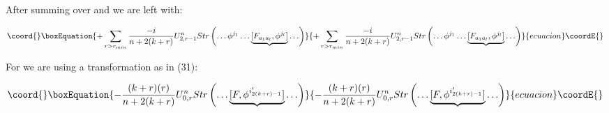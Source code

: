 \documentclass[a4paper,12pt]{article}
\begin{document}
After summing over \coordHE{} and \coordHE{} we are left with:
\begin{center}
\coordHE{}
\begin{equation}\coord{}\boxEquation{
+\sum_{r>r_{min}}\frac{-i}{n+2(k+r)}U^n_{2,r-1}Str\left(\ldots \phi^{j_1}\ldots \underbrace{[F_{a_1a_l},\phi^{j_l}]}\ldots \right) 
}{
+\sum_{r>r_{min}}\frac{-i}{n+2(k+r)}U^n_{2,r-1}Str\left(\ldots \phi^{j_1}\ldots \underbrace{[F_{a_1a_l},\phi^{j_l}]}\ldots \right) 
}{ecuacion}\coordE{}\end{equation}
\end{center}
For \coordHE{} we are using a transformation as in (31):
\begin{center}
\coordHE{}
\begin{equation}\coord{}\boxEquation{
-\frac{(k+r)(r)}{n+2(k+r)}U^n_{0,r}Str\left(\ldots \underbrace{[F,\phi^{i_{2(k+r)-1}'}]}\ldots \right)
}{
-\frac{(k+r)(r)}{n+2(k+r)}U^n_{0,r}Str\left(\ldots \underbrace{[F,\phi^{i_{2(k+r)-1}'}]}\ldots \right)
}{ecuacion}\coordE{}\end{equation} 
\end{center}
\end{document}
